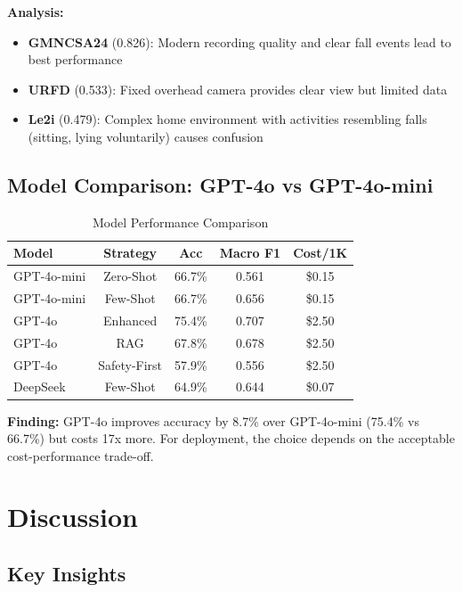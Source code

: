 \documentclass[conference]{IEEEtran}
\begin{document}
\textbf{Analysis:}
\begin{itemize}[leftmargin=*]
    \item \textbf{GMNCSA24} (0.826): Modern recording quality and clear fall events lead to best performance
    \item \textbf{URFD} (0.533): Fixed overhead camera provides clear view but limited data
    \item \textbf{Le2i} (0.479): Complex home environment with activities resembling falls (sitting, lying voluntarily) causes confusion
\end{itemize}

\subsection{Model Comparison: GPT-4o vs GPT-4o-mini}

\begin{table}[H]
\centering
\caption{Model Performance Comparison}
\label{tab:model_comparison}
\begin{tabular}{lcccc}
\toprule
\textbf{Model} & \textbf{Strategy} & \textbf{Acc} & \textbf{Macro F1} & \textbf{Cost/1K} \\
\midrule
GPT-4o-mini & Zero-Shot & 66.7\% & 0.561 & \$0.15 \\
GPT-4o-mini & Few-Shot & 66.7\% & 0.656 & \$0.15 \\
GPT-4o & Enhanced & 75.4\% & 0.707 & \$2.50 \\
GPT-4o & RAG & 67.8\% & 0.678 & \$2.50 \\
GPT-4o & Safety-First & 57.9\% & 0.556 & \$2.50 \\
DeepSeek & Few-Shot & 64.9\% & 0.644 & \$0.07 \\
\bottomrule
\end{tabular}
\end{table}

\textbf{Finding:} GPT-4o improves accuracy by 8.7\% over GPT-4o-mini (75.4\% vs 66.7\%) but costs 17x more. For deployment, the choice depends on the acceptable cost-performance trade-off.

\section{Discussion}

\subsection{Key Insights}
\end{document}
